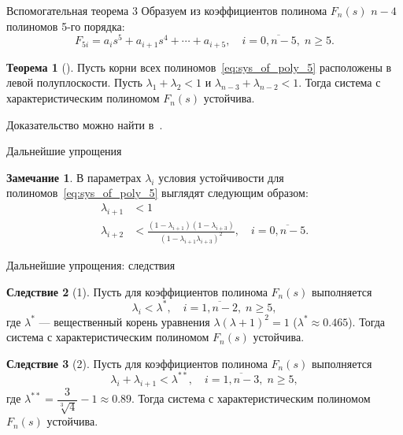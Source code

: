 \documentclass[notheorems,aspectratio=169]{beamer}
\theoremstyle{definition}
\newtheorem{theorem}{Теорема}
\newtheorem{remark}{Замечание}
\newtheorem{corollary}[theorem]{Следствие}
\begin{document}
\begin{frame}{Вспомогательная теорема 3}
  Образуем из коэффициентов полинома $F_n(s)$ $n-4$ полиномов 5-го порядка:
  \begin{equation}\label{eq:sys_of_poly_5}
    F_{5i} = a_i s^5 + a_{i+1} s^4 + \cdots + a_{i+5}, \quad i=\overline{0,n-5},\; n \geqslant 5.
  \end{equation}

  \begin{theorem}[\cite{LipatovSokolov1978}]
    Пусть корни всех полиномов~\eqref{eq:sys_of_poly_5} расположены в левой полуплоскости.
    Пусть $\lambda_1 + \lambda_2 < 1$ и $\lambda_{n-3} + \lambda_{n-2} < 1$. Тогда система с характеристическим полиномом
    $F_n(s)$ устойчива.
  \end{theorem}

  Доказательство можно найти в~\cite[стр.~34]{LipatovSokolov1978}.
\end{frame}

\begin{frame}{Дальнейшие упрощения}
  \begin{remark}
    В параметрах $\lambda_i$ условия устойчивости для полиномов~\eqref{eq:sys_of_poly_5} выглядят следующим образом:
    \begin{equation}
      \begin{aligned}
        \lambda_{i+1} &< 1 \\
        \lambda_{i+2} &< \frac{(1 - \lambda_{i+1}) (1 - \lambda_{i+3})}{{(1 - \lambda_{i+1}\lambda_{i+3})^2}}, \quad i=\overline{0,n-5}.
      \end{aligned}
    \end{equation}
  \end{remark}
\end{frame}

\begin{frame}{Дальнейшие упрощения: следствия}
  \begin{corollary}[1]
    Пусть для коэффициентов полинома $F_n(s)$ выполняется
    \begin{equation*}
        \lambda_i < \lambda^*, \quad i=\overline{1,n-2}, \; n \geqslant 5,
    \end{equation*}
    где $\lambda^*$ --- вещественный корень уравнения $\lambda {(\lambda + 1)}^2 = 1$ ($\lambda^* \approx 0.465$).
    Тогда система с характеристическим полиномом $F_n(s)$ устойчива.
  \end{corollary}

  \begin{corollary}[2]
    Пусть для коэффициентов полинома $F_n(s)$ выполняется
    \begin{equation*}
        \lambda_i + \lambda_{i+1} < \lambda^{**}, \quad i=\overline{1,n-3}, \; n \geqslant 5,
    \end{equation*}
    где $\lambda^{**} = \dfrac{3}{\sqrt[3]{4}} - 1 \approx 0.89$.
    Тогда система с характеристическим полиномом $F_n(s)$ устойчива.
  \end{corollary}
\end{frame}
\end{document}

